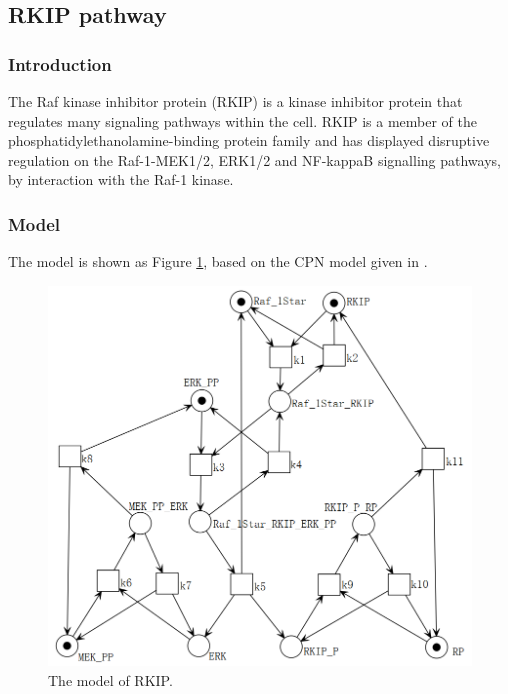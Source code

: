 \documentclass[journal,a4paper,onecolumn]{article}
\begin{document}
\clearpage
\subsection{RKIP pathway}

\subsubsection{Introduction}

The Raf kinase inhibitor protein (RKIP) \cite{CSK+03} is a kinase inhibitor protein that regulates many signaling pathways within the cell. RKIP is a member of the phosphatidylethanolamine-binding protein family and has displayed disruptive regulation on the Raf-1-MEK1/2, ERK1/2 and NF-kappaB signalling pathways, by interaction with the Raf-1 kinase. 

\subsubsection{Model}
The model is shown as Figure \ref{fig:The model of RKIP}, based on the CPN model given in \cite{GH06}.

\begin{figure}[!hbt]
	\begin{center}
		\includegraphics[width=\columnwidth]{fig28}
		\caption{The model of RKIP.}
		\label{fig:The model of RKIP}
	\end{center}
\end{figure}
\end{document}

